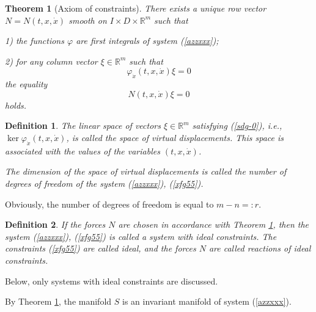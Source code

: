 \documentclass[reqno,12pt]{amsproc}
\newtheorem{theo}{Theorem}
\newtheorem{df}{Definition}
\newcommand\ph\varphi
\begin{document}
\begin{theo}[Axiom of constraints]\label{as11}
There exists a unique row vector $N=N(t,x,\dot x)$ smooth on $I\times D\times \mathbb{R}^m$ such that

1) the functions $\ph$ are first integrals of system (\ref{azzxxx});

2) for any column vector $\xi\in\mathbb{R}^m$ such that
\begin{equation}\label{sdg-0}\ph_{\dot x}(t,x,\dot x)\xi=0\end{equation}
the equality
\begin{equation}\label{sfg43}N(t,x,\dot x)\xi =0\end{equation}
holds.
\end{theo}\begin{df}The linear space of vectors $\xi\in\mathbb{R}^m$ satisfying (\ref{sdg-0}), i.e., $\ker\ph_{\dot x}(t,x,\dot x)$, is called the space of virtual displacements. This space is associated with the values of the variables $(t,x,\dot x)$.


The dimension of the space of virtual displacements is called the number of degrees of freedom of the system
(\ref{azzxxx}), (\ref{xfg55}).
\end{df} Obviously, the number of degrees of freedom is equal to $m-n=:r$.



\begin{df} If the forces $N$ are chosen in accordance with Theorem \ref{as11}, then the system (\ref{azzxxx}), (\ref{xfg55}) is called a system with ideal constraints. The constraints (\ref{xfg55}) are called ideal, and the forces $N$ are called reactions of ideal constraints.\end{df}


Below, only systems with ideal constraints are discussed.

By Theorem \ref{as11}, the manifold $S$ is an invariant manifold of system (\ref{azzxxx}).
\end{document}
